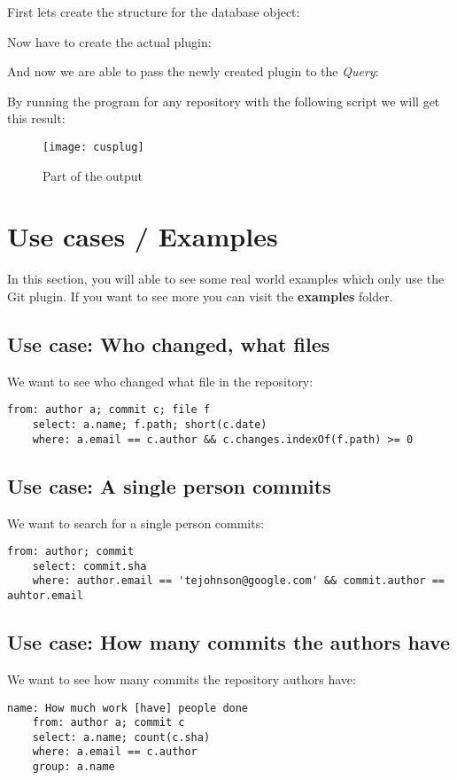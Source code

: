 First lets create the structure for the database object:


Now have to create the actual plugin:


And now we are able to pass the newly created plugin to the \textit{Query}:


By running the program for any repository with the following script we will get this result:




\begin{figure}[H]
	\centering
	\texttt{[image: cusplug]}
	\caption{Part of the output}
	\label{fig:fig-cusplug}
\end{figure}


\section{Use cases / Examples}

In this section, you will able to see some real world examples which only use the Git plugin.
If you want to see more you can visit the \textbf{examples} folder.

\subsection{Use case: Who changed, what files}

We want to see who changed what file in the repository:

\begin{lstlisting}[caption={whochanged.yaml}]
	from: author a; commit c; file f
	select: a.name; f.path; short(c.date)
	where: a.email == c.author && c.changes.indexOf(f.path) >= 0
\end{lstlisting}

\subsection{Use case: A single person commits}

We want to search for a single person commits:

\begin{lstlisting}[caption={authorcommits.yaml}]
	from: author; commit
	select: commit.sha
	where: author.email == 'tejohnson@google.com' && commit.author == auhtor.email
\end{lstlisting}

\subsection{Use case: How many commits the authors have}

We want to see how many commits the repository authors have:

\begin{lstlisting}[caption={howmuchwork.yaml}]
	name: How much work [have] people done
	from: author a; commit c
	select: a.name; count(c.sha)
	where: a.email == c.author
	group: a.name
\end{lstlisting}